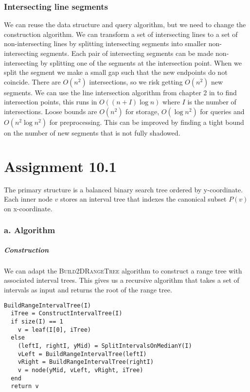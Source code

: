 \documentclass[10pt,a4paper,final,oneside,openany,article,oldfontcommands]{memoir}
\begin{document}
\subsection*{Intersecting line segments}
We can reuse the data structure and query algorithm, but we need to change the construction algorithm. We can transform a set of intersecting lines to a set of non-intersecting lines by splitting intersecting segments into smaller non-intersecting segments. Each pair of intersecting segments can be made non-intersecting by splitting one of the segments at the intersection point. When we split the segment we make a small gap such that the new endpoints do not coincide. There are $O(n^2)$ intersections, so we risk getting $O(n^2)$ new segments. We can use the line intersection algorithm from chapter 2 in \cite{deBerg} to find intersection points, this runs in $O((n + I)\log n)$ where $I$ is the number of intersections. Loose bounds are $O(n^2)$ for storage, $O(\log n^2)$ for queries and $O(n^2 \log n^2)$ for preprocessing. This can be improved by finding a tight bound on the number of new segments that is not fully shadowed.



\chapter*{Assignment 10.1}
The primary structure is a balanced binary search tree ordered by y-coordinate. Each inner node $v$ stores an interval tree that indexes the canonical subset $P(v)$ on x-coordinate.

\subsection*{a. Algorithm}

\paragraph{Construction}
We can adapt the \textsc{Build2DRangeTree} algorithm to construct a range tree with associated interval trees. This gives us a recursive algorithm that takes a set of intervals as input and returns the root of the range tree.
\begin{verbatim}
BuildRangeIntervalTree(I)  
  iTree = ConstructIntervalTree(I)
  if size(I) == 1
    v = leaf(I[0], iTree)
  else
    (leftI, rightI, yMid) = SplitIntervalsOnMedianY(I)
    vLeft = BuildRangeIntervalTree(leftI)
    vRight = BuildRangeIntervalTree(rightI)
    v = node(yMid, vLeft, vRight, iTree)
  end
  return v
\end{verbatim}
\end{document}
